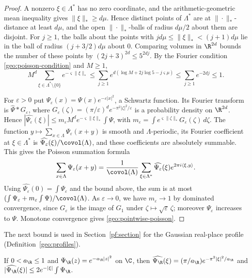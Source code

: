 \begin{proof}
A nonzero $\xi\in\Lambda^*$ has no zero coordinate, and the
arithmetic-geometric mean inequality gives $\|\xi\|_*\ge d\mu$. Hence
distinct points of $\Lambda^*$ are at $\|\cdot\|_*$-distance at least
$d\mu$, and the open $\|\cdot\|_*$-balls of radius $d\mu/2$ about them
are disjoint. For $j\ge1$, the balls about the points with
$jd\mu\le\|\xi\|_*<(j+1)d\mu$ lie in the ball of radius $(j+3/2)d\mu$
about $0$. Comparing volumes in $\R^{2d}$ bounds the number of these
points by $(2j+3)^{2d}\le5^{2dj}$. By the Fourier condition
\eqref{geo:poisson-condition} and
$M\ge1$,
\[
 M^d\sum_{\xi\in\Lambda^*\setminus\{0\}}e^{-\varsigma\|\xi\|_*}
 \le\sum_{j\ge1}e^{d(\log M+2j\log5-j\varsigma\mu)}
 \le\sum_{j\ge1}e^{-2dj}\le1 .
\]

For $\varepsilon>0$ put $\Psi_\varepsilon(x)=\Psi(x)e^{-\varepsilon|x|^2}$, a Schwartz
function. Its Fourier transform is $\widehat\Psi*G_\varepsilon$, where
$G_\varepsilon(\zeta)=(\pi/\varepsilon)^de^{-\pi^2|\zeta|^2/\varepsilon}$ is a probability
density on $\R^{2d}$. Hence
$|\widehat{\Psi_\varepsilon}(\xi)|\le m_\varepsilon M^de^{-\varsigma\|\xi\|_*}\int\Psi$,
with $m_\varepsilon=\int e^{\varsigma\|\zeta\|_*}G_\varepsilon(\zeta)\,d\zeta$. The function
$y\mapsto\sum_{x\in\Lambda}\Psi_\varepsilon(x+y)$ is smooth and
$\Lambda$-periodic, its Fourier coefficient at $\xi\in\Lambda^*$ is
$\widehat{\Psi_\varepsilon}(\xi)/\covol(\Lambda)$, and these coefficients are
absolutely summable. This gives the Poisson summation formula
\[
 \sum_{x\in\Lambda}\Psi_\varepsilon(x+y)
 =\frac1{\covol(\Lambda)}\sum_{\xi\in\Lambda^*}\widehat{\Psi_\varepsilon}(\xi)
 e^{2\pi i\langle\xi,y\rangle}.
\]
Using $\widehat{\Psi_\varepsilon}(0)=\int\Psi_\varepsilon$ and the bound above, the sum
is at most $(\int\Psi_\varepsilon+m_\varepsilon\int\Psi)/\covol(\Lambda)$. As
$\varepsilon\to0$, we have $m_\varepsilon\to1$ by dominated convergence, since
$G_\varepsilon$ is the image of $G_1$ under $\zeta\mapsto\sqrt\varepsilon\,\zeta$;
moreover $\Psi_\varepsilon$ increases to $\Psi$. Monotone convergence gives
\eqref{geo:pointwise-poisson}.
\end{proof}

The next bound is used in Section~\ref{pf:section} for the Gaussian
real-place profile (Definition~\ref{geo:profiles}).

\begin{lemma}\label{geo:gaussian}
If $0<a_\R\le1$ and $\Psi_\R(z)=e^{-a_\R|z|^2}$ on $\C$, then
$\widehat{\Psi_\R}(\xi)=(\pi/a_\R)e^{-\pi^2|\xi|^2/a_\R}$ and
$|\widehat{\Psi_\R}(\xi)|\le2e^{-|\xi|}\int\Psi_\R$.
\end{lemma}

